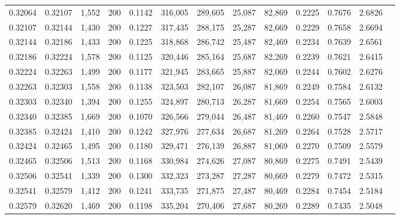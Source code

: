 \begin{tabular}{rrrrrrrrrrrrr}
0.32064 & 0.32107 & 1,552 & 200 &                                     0.1142 & 316,005 & 289,605 &  25,087 &  82,869 & 0.2225 & 0.7676 & 2.6826 \\
0.32107 & 0.32144 & 1,430 & 200 &                                     0.1227 & 317,435 & 288,175 &  25,287 &  82,669 & 0.2229 & 0.7658 & 2.6694 \\
0.32144 & 0.32186 & 1,433 & 200 &                                     0.1225 & 318,868 & 286,742 &  25,487 &  82,469 & 0.2234 & 0.7639 & 2.6561 \\
0.32186 & 0.32224 & 1,578 & 200 &                                     0.1125 & 320,446 & 285,164 &  25,687 &  82,269 & 0.2239 & 0.7621 & 2.6415 \\
0.32224 & 0.32263 & 1,499 & 200 &                                     0.1177 & 321,945 & 283,665 &  25,887 &  82,069 & 0.2244 & 0.7602 & 2.6276 \\
0.32263 & 0.32303 & 1,558 & 200 &                                     0.1138 & 323,503 & 282,107 &  26,087 &  81,869 & 0.2249 & 0.7584 & 2.6132 \\
0.32303 & 0.32340 & 1,394 & 200 &                                     0.1255 & 324,897 & 280,713 &  26,287 &  81,669 & 0.2254 & 0.7565 & 2.6003 \\
0.32340 & 0.32385 & 1,669 & 200 &                                     0.1070 & 326,566 & 279,044 &  26,487 &  81,469 & 0.2260 & 0.7547 & 2.5848 \\
0.32385 & 0.32424 & 1,410 & 200 &                                     0.1242 & 327,976 & 277,634 &  26,687 &  81,269 & 0.2264 & 0.7528 & 2.5717 \\
0.32424 & 0.32465 & 1,495 & 200 &                                     0.1180 & 329,471 & 276,139 &  26,887 &  81,069 & 0.2270 & 0.7509 & 2.5579 \\
0.32465 & 0.32506 & 1,513 & 200 &                                     0.1168 & 330,984 & 274,626 &  27,087 &  80,869 & 0.2275 & 0.7491 & 2.5439 \\
0.32506 & 0.32541 & 1,339 & 200 &                                     0.1300 & 332,323 & 273,287 &  27,287 &  80,669 & 0.2279 & 0.7472 & 2.5315 \\
0.32541 & 0.32579 & 1,412 & 200 &                                     0.1241 & 333,735 & 271,875 &  27,487 &  80,469 & 0.2284 & 0.7454 & 2.5184 \\
0.32579 & 0.32620 & 1,469 & 200 &                                     0.1198 & 335,204 & 270,406 &  27,687 &  80,269 & 0.2289 & 0.7435 & 2.5048 \\

\end{tabular}
